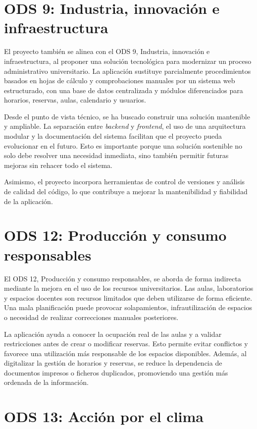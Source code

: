 \section{ODS 9: Industria, innovación e infraestructura}

El proyecto también se alinea con el ODS 9, Industria, innovación e infraestructura, al proponer una solución tecnológica para modernizar un proceso administrativo universitario. La aplicación sustituye parcialmente procedimientos basados en hojas de cálculo y comprobaciones manuales por un sistema web estructurado, con una base de datos centralizada y módulos diferenciados para horarios, reservas, aulas, calendario y usuarios.

Desde el punto de vista técnico, se ha buscado construir una solución mantenible y ampliable. La separación entre \textit{backend} y \textit{frontend}, el uso de una arquitectura modular y la documentación del sistema facilitan que el proyecto pueda evolucionar en el futuro. Esto es importante porque una solución sostenible no solo debe resolver una necesidad inmediata, sino también permitir futuras mejoras sin rehacer todo el sistema.

Asimismo, el proyecto incorpora herramientas de control de versiones y análisis de calidad del código, lo que contribuye a mejorar la mantenibilidad y fiabilidad de la aplicación.

\section{ODS 12: Producción y consumo responsables}

El ODS 12, Producción y consumo responsables, se aborda de forma indirecta mediante la mejora en el uso de los recursos universitarios. Las aulas, laboratorios y espacios docentes son recursos limitados que deben utilizarse de forma eficiente. Una mala planificación puede provocar solapamientos, infrautilización de espacios o necesidad de realizar correcciones manuales posteriores.

La aplicación ayuda a conocer la ocupación real de las aulas y a validar restricciones antes de crear o modificar reservas. Esto permite evitar conflictos y favorece una utilización más responsable de los espacios disponibles. Además, al digitalizar la gestión de horarios y reservas, se reduce la dependencia de documentos impresos o ficheros duplicados, promoviendo una gestión más ordenada de la información.

\section{ODS 13: Acción por el clima}

